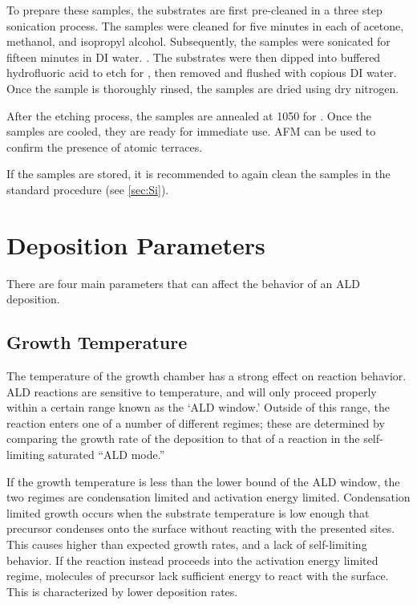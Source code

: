 To prepare these samples, the substrates are first pre-cleaned in a three step sonication process. The samples were cleaned for five minutes in each of acetone, methanol, and isopropyl alcohol. Subsequently, the samples were sonicated for fifteen minutes in DI water. . The substrates were then dipped into buffered hydrofluoric acid to etch for , then removed and flushed with copious DI water.  Once the sample is thoroughly rinsed, the samples are dried using dry nitrogen. 

After the etching process, the samples are annealed at 1050\degC{} for . Once the samples are cooled, they are ready for immediate use. AFM can be used to confirm the presence of atomic terraces. 

If the samples are stored, it is recommended to again clean the samples in the standard procedure (see \vref{sec:Si}).


\section{Deposition Parameters}
\label{sec:SampFab-DepParams}

There are four main parameters that can affect the behavior of an ALD deposition. 


\subsection{Growth Temperature}

The temperature of the growth chamber has a strong effect on reaction behavior. ALD reactions are sensitive to temperature, and will only proceed properly within a certain range known as the `ALD window.' Outside of this range, the reaction enters one of a number of different regimes; these are determined by comparing the growth rate of the deposition to that of a reaction in the self-limiting saturated ``ALD mode.'' 

If the growth temperature is less than the lower bound of the ALD window, the two regimes are condensation limited and activation energy limited. Condensation limited growth occurs when the substrate temperature is low enough that precursor condenses onto the surface without reacting with the presented sites. This causes higher than expected growth rates, and a lack of self-limiting behavior. If the reaction instead proceeds into the activation energy limited regime, molecules of precursor lack sufficient energy to react with the surface. This is characterized by lower deposition rates. 

